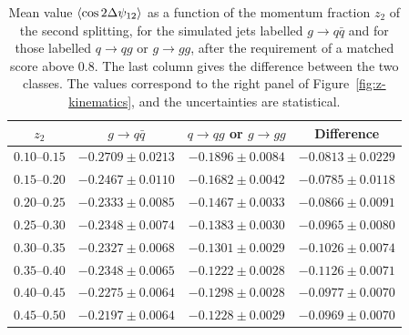 \begin{table}[htbp]
  \centering
  \caption{Mean value $\langle \cos 2\Delta\psi_{12} \rangle$ as a function of the momentum
  fraction $z_2$ of the second splitting, for the simulated jets labelled
  $g \to q\bar{q}$ and for those labelled $q \to qg$ or $g \to gg$, after the
  requirement of a matched score above $0.8$. The last column gives the
  difference between the two classes. The values correspond to the right panel
  of Figure~\ref{fig:z-kinematics}, and the uncertainties are statistical.}
  \label{tab:z-profile}
  \begin{tabular}{cccc}
    \toprule
    $z_2$ & $g \to q\bar{q}$ & $q \to qg$ or $g \to gg$ & Difference \\
    \midrule
    $0.10$--$0.15$ & $-0.2709 \pm 0.0213$ & $-0.1896 \pm 0.0084$ & $-0.0813 \pm 0.0229$ \\
    $0.15$--$0.20$ & $-0.2467 \pm 0.0110$ & $-0.1682 \pm 0.0042$ & $-0.0785 \pm 0.0118$ \\
    $0.20$--$0.25$ & $-0.2333 \pm 0.0085$ & $-0.1467 \pm 0.0033$ & $-0.0866 \pm 0.0091$ \\
    $0.25$--$0.30$ & $-0.2348 \pm 0.0074$ & $-0.1383 \pm 0.0030$ & $-0.0965 \pm 0.0080$ \\
    $0.30$--$0.35$ & $-0.2327 \pm 0.0068$ & $-0.1301 \pm 0.0029$ & $-0.1026 \pm 0.0074$ \\
    $0.35$--$0.40$ & $-0.2348 \pm 0.0065$ & $-0.1222 \pm 0.0028$ & $-0.1126 \pm 0.0071$ \\
    $0.40$--$0.45$ & $-0.2275 \pm 0.0064$ & $-0.1298 \pm 0.0028$ & $-0.0977 \pm 0.0070$ \\
    $0.45$--$0.50$ & $-0.2197 \pm 0.0064$ & $-0.1228 \pm 0.0029$ & $-0.0969 \pm 0.0070$ \\
    \bottomrule
  \end{tabular}
\end{table}

